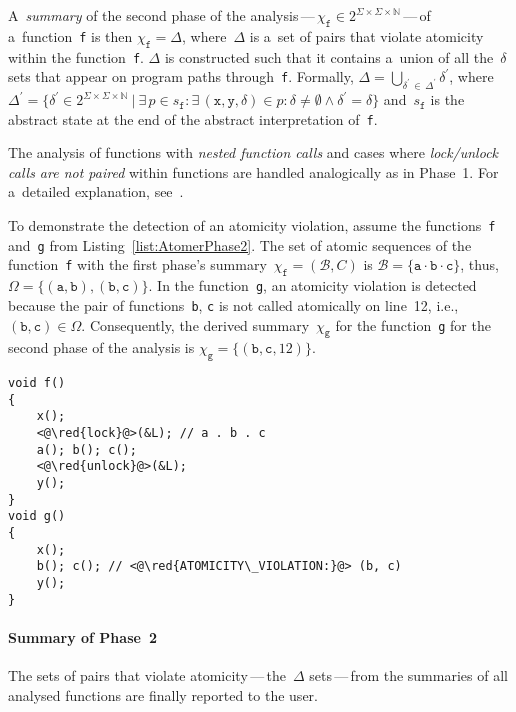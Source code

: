 A~\emph{summary} of the second phase of the analysis\,---\,$ \chi_\mathtt{f} \in 2^{\Sigma \times \Sigma \times \mathbb{N}} $\,---\,of a~function~\texttt{f} is then $ \chi_\mathtt{f} = \Delta $, where~$ \Delta $ is a~set of pairs that violate atomicity within the function~\texttt{f}. $ \Delta $ is constructed such that it contains a~union of all the~$ \delta $ sets that appear on program paths through~\texttt{f}. Formally, $ \Delta = \bigcup_{\delta^\prime\,\in\,\Delta^\prime} \delta^\prime $, where $ \Delta^\prime = \{\delta^\prime \in 2^{\Sigma \times \Sigma \times \mathbb{N}}\ |\ \exists\,p \in s_\mathtt{f} : \exists\,(\mathtt{x}, \mathtt{y}, \delta) \in p : \delta \neq \emptyset \wedge \delta^\prime = \delta\} $ and~$ s_\mathtt{f} $ is the abstract state at the end of the abstract interpretation of~\texttt{f}.

The analysis of functions with \emph{nested function calls} and cases where \emph{lock/unlock calls are not paired} within functions are handled analogically as in Phase~1. For a~detailed explanation, see~\cite{harmimBP}.

\begin{example}
    To demonstrate the detection of an atomicity violation, assume the functions~\texttt{f} and~\texttt{g} from Listing~\ref{list:AtomerPhase2}. The set of atomic sequences of the function~\texttt{f} with the first phase's summary~$ \chi_\mathtt{f} = (\mathcal{B}, C) $ is $ \mathcal{B} = \{\mathtt{a} \cdot \mathtt{b} \cdot \mathtt{c}\} $, thus, $ \Omega = \{(\mathtt{a}, \mathtt{b}), (\mathtt{b}, \mathtt{c})\} $. In the function~\texttt{g}, an atomicity violation is detected because the pair of functions~\texttt{b}, \texttt{c} is not called atomically on line~12, i.e., $ (\mathtt{b}, \mathtt{c}) \in \Omega $. Consequently, the derived summary~$ \chi_\mathtt{g} $ for the function~\texttt{g} for the second phase of the analysis is $ \chi_\mathtt{g} = \{(\mathtt{b}, \mathtt{c}, 12)\} $.
\end{example}

\begin{lstlisting}[style=c, label={list:AtomerPhase2}, float=hbt, caption={An example of an \emph{atomicity violation}}]
void f()
{
    x();
    <@\red{lock}@>(&L); // a . b . c
    a(); b(); c();
    <@\red{unlock}@>(&L);
    y();
}
void g()
{
    x();
    b(); c(); // <@\red{ATOMICITY\_VIOLATION:}@> (b, c)
    y();
}
\end{lstlisting}

\paragraph{Summary of Phase~2}
The sets of pairs that violate atomicity\,---\,the~$ \Delta $ sets\,---\,from the summaries of all analysed functions are finally reported to the user.


